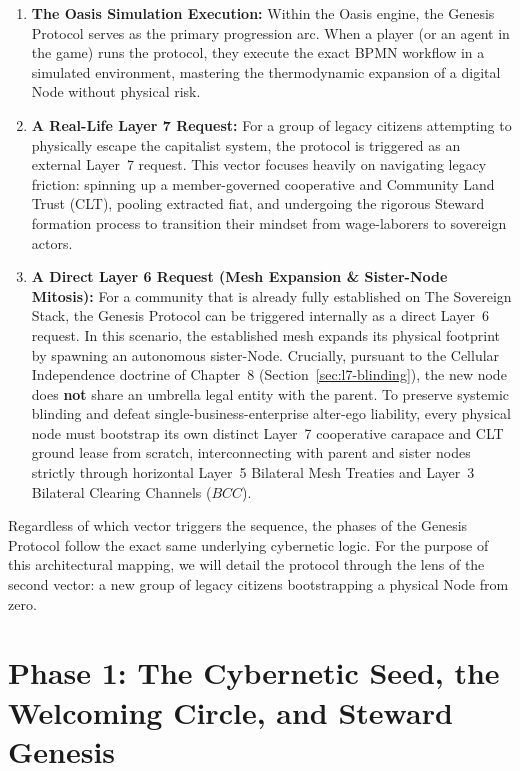 \begin{enumerate}
    \item \textbf{The Oasis Simulation Execution:} Within the Oasis engine, the Genesis Protocol serves as the primary progression arc. When a player (or an agent in the game) runs the protocol, they execute the exact BPMN workflow in a simulated environment, mastering the thermodynamic expansion of a digital Node without physical risk.
    \item \textbf{A Real-Life Layer 7 Request:} For a group of legacy citizens attempting to physically escape the capitalist system, the protocol is triggered as an external Layer~7 request. This vector focuses heavily on navigating legacy friction: spinning up a member-governed cooperative and Community Land Trust (CLT), pooling extracted fiat, and undergoing the rigorous Steward formation process to transition their mindset from wage-laborers to sovereign actors.
    \item \textbf{A Direct Layer 6 Request (Mesh Expansion \& Sister-Node Mitosis):} For a community that is already fully established on The Sovereign Stack, the Genesis Protocol can be triggered internally as a direct Layer~6 request. In this scenario, the established mesh expands its physical footprint by spawning an autonomous sister-Node. Crucially, pursuant to the Cellular Independence doctrine of Chapter~8 (Section~\ref{sec:l7-blinding}), the new node does \textbf{not} share an umbrella legal entity with the parent. To preserve systemic blinding and defeat single-business-enterprise alter-ego liability, every physical node must bootstrap its own distinct Layer~7 cooperative carapace and CLT ground lease from scratch, interconnecting with parent and sister nodes strictly through horizontal Layer~5 Bilateral Mesh Treaties and Layer~3 Bilateral Clearing Channels ($BCC$).
\end{enumerate}

Regardless of which vector triggers the sequence, the phases of the Genesis Protocol follow the exact same underlying cybernetic logic. For the purpose of this architectural mapping, we will detail the protocol through the lens of the second vector: a new group of legacy citizens bootstrapping a physical Node from zero.


\section[Phase 1: Cybernetic Seed and Steward Genesis]{Phase 1: The Cybernetic Seed, the Welcoming Circle, and Steward Genesis}

